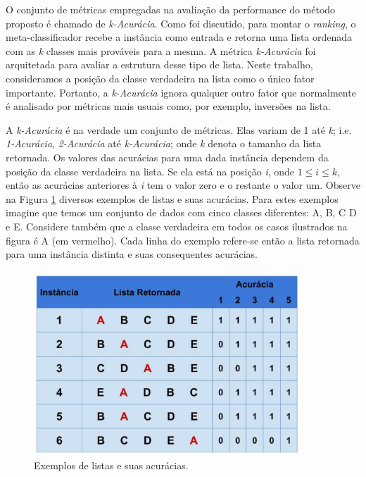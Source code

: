 O conjunto de métricas empregadas na avaliação da performance do método proposto é chamado de \textit{k-Acurácia}. 
Como foi discutido, para montar o \textit{ranking}, o meta-classificador recebe a instância como entrada e retorna uma lista ordenada com as \textit{k} classes mais prováveis para a mesma.
A métrica \textit{k-Acurácia} foi arquitetada para avaliar a estrutura desse tipo de lista.
Neste trabalho, consideramos a posição da classe verdadeira na lista como o único fator importante.
Portanto, a \textit{k-Acurácia} ignora qualquer outro fator que normalmente é analisado por métricas mais usuais como, por exemplo, inversões na lista.

A \textit{k-Acurácia} é na verdade um conjunto de métricas. 
Elas variam de 1 até \textit{k}; i.e. \textit{1-Acurácia}, \textit{2-Acurácia} até \textit{k-Acurácia}; onde \textit{k} denota o tamanho da lista retornada.
Os valores das acurácias para uma dada instância dependem da posição da classe verdadeira na lista.
Se ela está na posição \textit{i}, onde $1 \leq \textit{i} \leq \textit{k}$, então as acurácias anteriores à \textit{i} tem o valor zero e o restante o valor um.
Observe na Figura \ref{fig:descricaodostestes01} diversos exemplos de listas e suas acurácias.
Para estes exemplos imagine que temos um conjunto de dados com cinco classes diferentes: A, B, C D e E.
Considere também que a classe verdadeira em todos os casos ilustrados na figura é A (em vermelho).
Cada linha do exemplo refere-se então a lista retornada para uma instância distinta e suas consequentes acurácias.

\begin{figure}[h!]
  \centering
  \includegraphics[width=100mm,scale=0.7]{images/descricaodostestes01.eps}
  \caption{Exemplos de listas e suas acurácias.}
  \label{fig:descricaodostestes01}
\end{figure}

